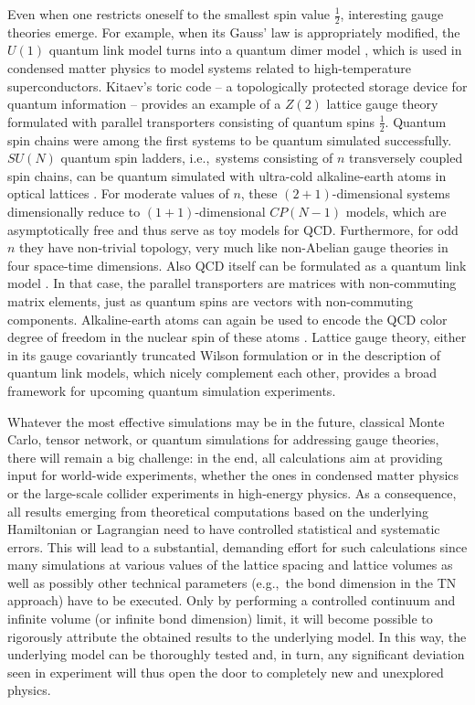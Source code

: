 \documentclass[epj,final]{svjour}
\begin{document}
Even when one restricts oneself to the smallest spin value $\frac{1}{2}$, interesting gauge theories emerge. For example, when its Gauss' law is appropriately modified, the $U(1)$ quantum link model turns into a quantum dimer model \cite{Rokhsar1988Dimers,Banerjee:2014wpa}, which is used in condensed matter physics to model systems related to high-temperature superconductors. Kitaev's toric code \cite{Kitaev:1997wr} -- a topologically protected storage device for quantum information -- provides an example of a $Z(2)$ lattice gauge theory formulated with parallel transporters consisting of quantum spins $\frac{1}{2}$. Quantum spin chains were among the first systems to be quantum simulated successfully. $SU(N)$ quantum spin ladders, i.e.,\ systems consisting of $n$ transversely coupled spin chains, can be quantum simulated with ultra-cold alkaline-earth atoms in optical lattices \cite{laflamme2016cp}. For moderate values of $n$, these $(2+1)$-dimensional systems dimensionally reduce to $(1+1)$-dimensional $CP(N-1)$ models, which are asymptotically free and thus serve as toy models for QCD. Furthermore, for odd $n$ they have non-trivial topology, very much like non-Abelian gauge theories in four space-time dimensions. Also QCD itself can be formulated as a quantum link model \cite{Brower:1997ha,Wiese:2014rla}. In that case, the parallel transporters are matrices with non-commuting matrix elements, just as quantum spins are vectors with non-commuting components. Alkaline-earth atoms can again be used to encode the QCD color degree of freedom in the nuclear spin of these atoms \cite{banerjee2013atomic}. Lattice gauge theory, either in its gauge covariantly truncated Wilson formulation or in the description of quantum link models, which nicely complement each other, provides a broad framework for upcoming quantum simulation experiments.

Whatever the most effective simulations may be in the future, classical Monte Carlo, tensor network, or quantum simulations for addressing gauge theories, there will remain a big challenge: in the end, all calculations aim at providing input for world-wide experiments, whether the ones in condensed matter physics or the large-scale collider experiments in high-energy physics. As a consequence, all results emerging from theoretical computations based on the underlying Hamiltonian or Lagrangian need to have controlled statistical and systematic errors. This will lead to a substantial, demanding effort for such calculations since many simulations at various values of the lattice spacing and lattice volumes as well as possibly other technical parameters (e.g.,\ the bond dimension in the TN approach) have to be executed. Only by performing a controlled continuum and infinite volume (or infinite bond dimension) limit, it will become possible to rigorously attribute the obtained results to the underlying model. In this way, the underlying model can be thoroughly tested and, in turn, any significant deviation seen in experiment will thus open the door to completely new and unexplored physics. 
\end{document}
